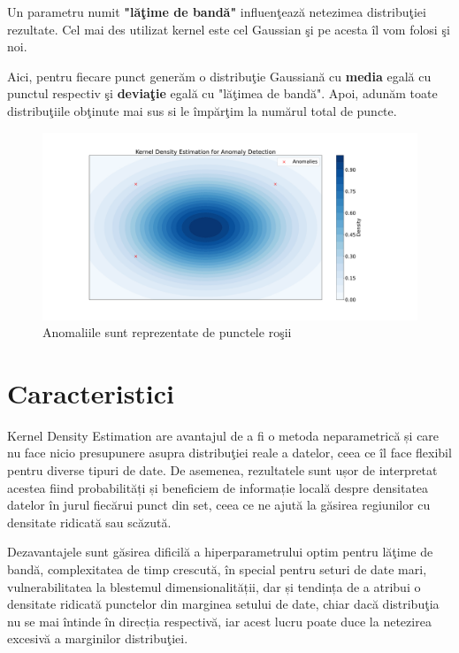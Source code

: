 Un parametru numit \textbf{"lăţime de bandă"} influenţează netezimea distribuţiei 
rezultate.
Cel mai des utilizat kernel este cel Gaussian şi pe acesta îl vom folosi şi noi.

Aici, pentru fiecare punct generăm o distribuţie Gaussiană cu \textbf{media} egală
cu punctul respectiv şi \textbf{deviaţie} egală cu "lăţimea de bandă". Apoi, adunăm toate 
distribuţiile obţinute mai sus si le împărţim la numărul total de puncte.

\begin{figure}[H]
    \centering
    \includegraphics[width=\linewidth]{images/KDEShowOff.pdf}
    \caption{Anomaliile sunt reprezentate de punctele roşii}
\end{figure}

\section{Caracteristici}

Kernel Density Estimation are avantajul de a fi o metoda 
neparametrică și care nu face nicio presupunere asupra 
distribuţiei reale a datelor, ceea ce îl face flexibil 
pentru diverse tipuri de date. De asemenea, rezultatele 
sunt ușor de interpretat acestea fiind probabilități și 
beneficiem de informație locală despre
densitatea datelor în jurul fiecărui punct 
din set, ceea ce ne ajută la găsirea regiunilor cu densitate ridicată 
sau scăzută.

Dezavantajele sunt găsirea dificilă a hiperparametrului 
optim pentru 
lăţime de bandă, complexitatea de timp crescută, în special 
pentru seturi de date mari, vulnerabilitatea la blestemul 
dimensionalității, dar și tendința de a atribui o densitate 
ridicată punctelor din marginea setului de date, chiar 
dacă distribuţia nu se mai întinde în direcția respectivă, 
iar acest lucru poate duce la netezirea excesivă a marginilor 
distribuţiei.

